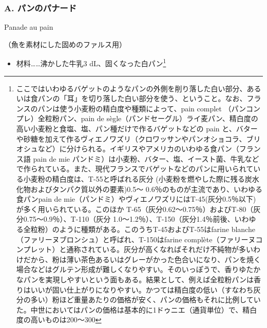 \begin{recette}

\hypertarget{panade-a}{%
\subsubsection{A. パンのパナード}\label{panade-a}}

\begin{frsubenv}

Panade au pain

\end{frsubenv}


（魚を素材にした固めのファルス用）

\begin{itemize}
\item
  材料\ldots{}\ldots{}沸かした牛乳3 dL、固くなった白パン\footnote{ここではいわゆるバゲットのようなパンの外側を削り落した白い部分、あるいは食パンの「耳」を切り落した白い部分を使う、ということ。なお、フランスのパンは使う小麦粉の精白度や種類によって、pain
    complet （パンコンプレ）全粒粉パン、pain de
    sègle（パンドセーグル）ライ麦パン、精白度の高い小麦粉と食塩、塩、パン種だけで作るバゲットなどの
    pain
    と、バターや砂糖を加えて作るヴィエノワズリ（クロワッサンやパンオショコラ、ブリオシュなど）に分けられる。イギリスやアメリカのいわゆる食パン（フランス語
    pain de mie
    パンドミ）は小麦粉、バター、塩、イースト菌、牛乳などで作られている。また、現代フランスでバゲットなどのパンに用いられている小麦粉の精白度は、T-55と呼ばれる灰分
    (小麦粉を燃やした際に残る炭水化物およびタンパク質以外の要素)0.5〜
    0.6％のものが主流であり、いわゆる食パンpain de
    mie（パンドミ）やヴィエノワズリにはT-45(灰分0.5％以下)が多く用いられている。このほか
    T-65（灰分0.62〜0.75％）およびT-80（灰分0.75〜0.9％）、T-110（灰分
    1.0〜1.2％）、T-150（灰分1.4％前後、いわゆる全粒粉）のように種類がある。このうちT-45およびT-55はfarine
    blanche（ファリーヌブロンシュ）と呼ばれ、T-150はfarine
    complète（ファリーヌコンプレット）と通称されている。灰分が高くなればそれだけ不純物が多いわけだから、粉は薄い茶色あるいはグレーがかった色合いになり、パンを焼く場合などはグルテン形成が難しくなりやすい。そのいっぽうで、香りゆたかなパンを実現しやすいという面もある。結果として、例えば全粒粉パンは香りはいいが固い仕上がりになりやすい。かつては精白度の低い（すなわち灰分の多い）粉ほど重量あたりの価格が安く、パンの価格もそれに比例していた。中世においてはパンの価格は基本的に1ドゥニエ（通貨単位）で、精白度の高いものは200〜300
}
\end{itemize}
\end{recette}
